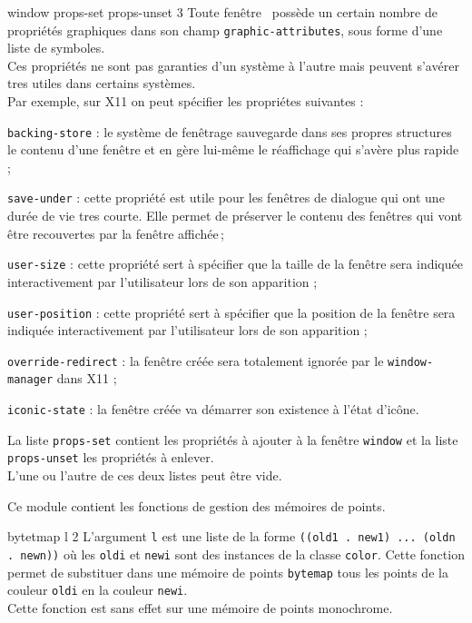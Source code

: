  {window props-set props-unset} {3}
Toute fen\^{e}tre \LeLisp\ poss\`{e}de un certain nombre de propri\'{e}t\'{e}s graphiques
dans son champ {\tt graphic-attributes}, sous forme d'une liste de symboles.\\
Ces propri\'{e}t\'{e}s ne sont pas garanties d'un syst\`{e}me \`{a} l'autre mais 
peuvent s'av\'{e}rer tres utiles dans certains syst\`{e}mes.\\
Par exemple, sur X11 on peut sp\'{e}cifier les propri\'{e}tes suivantes :
\begin {Itemize}
\item {\tt backing-store} : le syst\`{e}me de fen\^{e}trage sauvegarde dans ses
propres structures le contenu d'une fen\^{e}tre et en g\`{e}re lui-m\^{e}me le
r\'{e}affichage qui s'av\`{e}re plus rapide ;
\item {\tt save-under} : cette propri\'{e}t\'{e} est utile pour les fen\^{e}tres de
dialogue qui ont une dur\'{e}e de vie tres courte.
Elle permet de pr\'{e}server le contenu des fen\^{e}tres qui vont \^{e}tre
recouvertes par la fen\^{e}tre affich\'{e}e\,;
\item {\tt user-size} : cette propri\'{e}t\'{e} sert \`{a} sp\'{e}cifier que la taille
de la fen\^{e}tre sera indiqu\'{e}e interactivement par l'utilisateur lors de son
apparition ;
\item {\tt user-position} : cette propri\'{e}t\'{e} sert \`{a} sp\'{e}cifier que la
position de la fen\^{e}tre sera indiqu\'{e}e interactivement par l'utilisateur
lors de son apparition ;
\item {\tt override-redirect} : la fen\^{e}tre cr\'{e}\'{e}e sera totalement ignor\'{e}e
par le {\tt window-manager} dans X11 ;
\item {\tt iconic-state} : la fen\^{e}tre cr\'{e}\'{e}e va d\'{e}marrer son existence \`{a}
l'\'{e}tat d'ic\^{o}ne.
\end{Itemize}
La liste {\tt props-set} contient les propri\'{e}t\'{e}s \`{a} ajouter \`{a} la fen\^{e}tre
{\tt window} et la liste {\tt props-unset} les propri\'{e}t\'{e}s \`{a} enlever.\\
L'une ou l'autre de ces deux listes peut \^{e}tre vide.


\EndHide



Ce module contient les fonctions de gestion des m\'{e}moires de points.


 {bytetmap l} {2}
L'argument {\tt l} est une liste de la forme
{\tt ((old1 . new1) ... (oldn . newn))}
o\`{u} les {\tt oldi} et {\tt newi} sont des instances de la classe {\tt color}.
Cette fonction permet de substituer dans une m\'{e}moire de points {\tt bytemap}
tous les points de la couleur {\tt oldi} en la couleur {\tt newi}.\\
Cette fonction est sans effet sur une m\'{e}moire de points monochrome.


